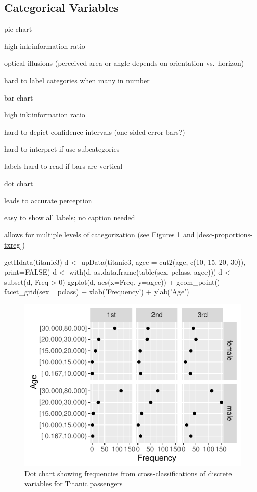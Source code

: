 \subsection{Categorical Variables}
\bi
\item pie chart
 \bi
 \item high ink:information ratio
 \item optical illusions (perceived area or angle depends on
   orientation vs.\ horizon)
 \item hard to label categories when many in number
 \ei
\item bar chart
 \bi
 \item high ink:information ratio
 \item hard to depict confidence intervals (one sided error bars?)
 \item hard to interpret if use subcategories
 \item labels hard to read if bars are vertical
 \ei
\item dot chart
 \bi
 \item leads to accurate perception
 \item easy to show all labels; no caption needed
 \item allows for multiple levels of categorization (see Figures \ref{fig:descript-counts-dotchart} and \ref{desc-proportions-txreg})
 
\begin{Schunk}
\begin{Sinput}
getHdata(titanic3)
d <- upData(titanic3,
            agec     = cut2(age, c(10, 15, 20, 30)), print=FALSE)
d <- with(d, as.data.frame(table(sex, pclass, agec)))
d <- subset(d, Freq > 0)
ggplot(d, aes(x=Freq, y=agec)) + geom_point() +
  facet_grid(sex ~ pclass) +
  xlab('Frequency') + ylab('Age')
\end{Sinput}
\begin{figure}[htbp]

\centerline{\includegraphics{descript-counts-dotchart-1} }

\caption[Frequency dot chart]{Dot chart showing frequencies from cross-classifications of discrete variables for Titanic passengers}\label{fig:descript-counts-dotchart}
\end{figure}
\end{Schunk}

